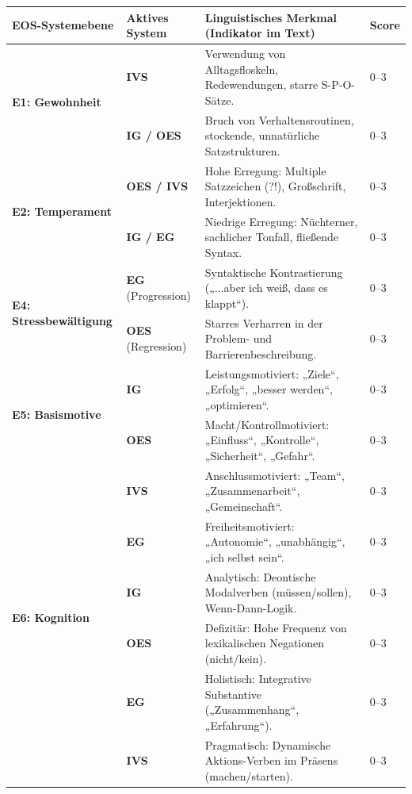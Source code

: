 \begin{table}[htbp]
\centering
\small
\renewcommand{\arraystretch}{1.3}
\begin{tabularx}{\textwidth}{l p{2.2cm} X l}
\hline
\textbf{EOS-Systemebene} & \textbf{Aktives System} & \textbf{Linguistisches Merkmal (Indikator im Text)} & \textbf{Score} \\
\hline

\multirow{2}{*}{\textbf{E1: Gewohnheit}} 
& \textbf{IVS} & Verwendung von Alltagsfloskeln, Redewendungen, starre S-P-O-Sätze. & 0--3 \\
& \textbf{IG / OES} & Bruch von Verhaltensroutinen, stockende, unnatürliche Satzstrukturen. & 0--3 \\
\hline

\multirow{2}{*}{\textbf{E2: Temperament}} 
& \textbf{OES / IVS} & Hohe Erregung: Multiple Satzzeichen (?!), Großschrift, Interjektionen. & 0--3 \\
& \textbf{IG / EG} & Niedrige Erregung: Nüchterner, sachlicher Tonfall, fließende Syntax. & 0--3 \\
\hline

\multirow{2}{*}{\textbf{E4: Stressbewältigung}} 
& \textbf{EG} (Progression) & Syntaktische Kontrastierung („...aber ich weiß, dass es klappt“). & 0--3 \\
& \textbf{OES} (Regression) & Starres Verharren in der Problem- und Barrierenbeschreibung. & 0--3 \\
\hline

\multirow{2}{*}{\textbf{E5: Basismotive}} 
& \textbf{IG} & Leistungsmotiviert: „Ziele“, „Erfolg“, „besser werden“, „optimieren“. & 0--3 \\
& \textbf{OES} & Macht/Kontrollmotiviert: „Einfluss“, „Kontrolle“, „Sicherheit“, „Gefahr“. & 0--3 \\
& \textbf{IVS} & Anschlussmotiviert: „Team“, „Zusammenarbeit“, „Gemeinschaft“. & 0--3 \\
& \textbf{EG} & Freiheitsmotiviert: „Autonomie“, „unabhängig“, „ich selbst sein“. & 0--3 \\
\hline

\multirow{2}{*}{\textbf{E6: Kognition}} 
& \textbf{IG} & Analytisch: Deontische Modalverben (müssen/sollen), Wenn-Dann-Logik. & 0--3 \\
& \textbf{OES} & Defizitär: Hohe Frequenz von lexikalischen Negationen (nicht/kein). & 0--3 \\
& \textbf{EG} & Holistisch: Integrative Substantive („Zusammenhang“, „Erfahrung“). & 0--3 \\
& \textbf{IVS} & Pragmatisch: Dynamische Aktions-Verben im Präsens (machen/starten). & 0--3 \\
\hline


\end{tabularx}
\end{table}

